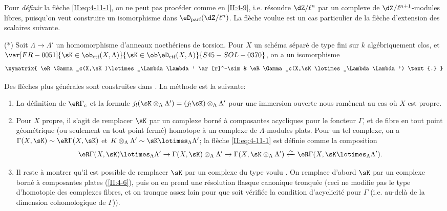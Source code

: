 Pour \emph{définir} la flèche \eqref{II:eq:4-11-1}, on ne peut pas 
procéder comme en \ref{II:4-9}, i.e. résoudre $\dZ/\ell^n$ par un complexe 
de $\dZ/\ell^{n+1}$-modules libres, puisqu'on veut construire un isomorphisme 
dans $\eD_\text{parf}(\dZ/\ell^n)$. La flèche voulue est un cas particulier de 
la flèche d'extension des scalaires suivante. 

(*) Soit $\Lambda\to\Lambda'$ un homomorphisme d'anneaux noethériens de 
torsion. Pour $X$ un schéma séparé de type fini sur $k$ algébriquement 
clos, et $\var[FR-0051]{\sK\in\ob_{\text{ctf}}(X,\Lambda)}{\sK\in\ob\eD_\text{ctf}(X,\Lambda)}{S45-SOL-0370}$, on a un isomorphisme 
\[\xymatrix{
  \eR\Gamma_c(X,\sK)\lotimes_\Lambda \Lambda' \ar[r]^-\sim & \eR \Gamma_c(X,\sK\lotimes_\Lambda \Lambda') \text{.}
}\]

Des flèches plus générales sont construites dans . La 
m\'
ethode est la suivante: 
\begin{enumerate}[\indent a)]
  \item {}La définition de $\eR\Gamma_c$ et la formule 
    $j_!(\sK\otimes_\Lambda\Lambda') = (j_! \sK)\otimes_\Lambda\Lambda'$ pour une 
    immersion ouverte nous ramènent au cas où $X$ est propre. 
  \item Pour $X$ propre, il s'agit de remplacer $\sK$ par un complexe borné à 
    composantes acycliques pour le foncteur $\Gamma$, et de fibre en tout point 
    géométrique (ou seulement en tout point fermé) homotope à un 
    complexe de $\Lambda$-modules plats. Pour un tel complexe, on a 
    $\Gamma(X,\sK)\sim \eR\Gamma(X,\sK)$ et 
    $K\otimes_\Lambda\Lambda'\sim \sK\lotimes_\Lambda\Lambda'$; la flèche 
    \eqref{II:eq:4-11-1} est définie comme la composition 
    \[
      \eR\Gamma(X,\sK)\lotimes_\Lambda \Lambda' \to \Gamma(X,\sK)\otimes_\Lambda\Lambda' \to \Gamma(X,\sK\otimes_\Lambda\Lambda') \xleftarrow\sim \eR\Gamma(X,\sK\lotimes_\Lambda\Lambda') \text{.}
    \]
  \item Il reste à montrer qu'il est possible de remplacer $\sK$ par un 
    complexe du type voulu . On remplace d'abord $\sK$ par 
    un complexe borné à composantes plates (\ref{II:4-6}), puis on en prend 
    une résolution flasque canonique tronquée (ceci ne modifie pas le type 
    d'homotopie des complexes fibres, et on tronque assez loin pour que 
    soit vérifiée la condition d'acyclicité pour $\Gamma$ (i.e. au-delà 
    de la dimension cohomologique de $\Gamma$)). 
\end{enumerate}





